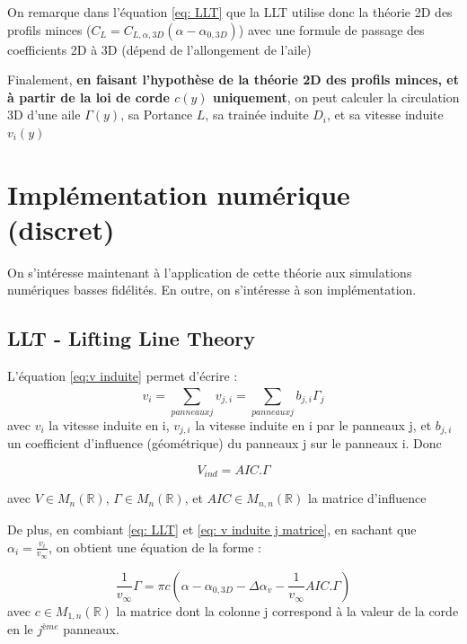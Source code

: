 On remarque dans l'équation \ref{eq: LLT} que la LLT utilise donc la théorie 2D des profils minces ($C_L = C_{L, \alpha, 3D}(\alpha - \alpha_{0,3D})$) avec une formule de passage des coefficients 2D à 3D (dépend de l'allongement de l'aile)

Finalement, \textbf{en faisant l'hypothèse de la théorie 2D des profils minces, et à partir de la loi de corde $c(y)$ uniquement}, on peut calculer la circulation 3D d'une aile $\Gamma(y)$, sa Portance $L$, sa trainée induite $D_i$, et sa vitesse induite $v_i(y)$

\section{Implémentation numérique (discret)} 
\label{sec:Ch1.2}

On s'intéresse maintenant à l'application de cette théorie aux simulations numériques basses fidélités. En outre, on s'intéresse à son implémentation. 

\subsection{LLT - Lifting Line Theory} 
\label{subsec:Ch1.2.1}

L'équation \ref{eq:v induite} permet d'écrire :
\begin{equation}
    v_i = \sum_{panneaux j}^{} v_{j,i} = \sum_{panneaux j}^{} b_{j,i} \Gamma_j
    \label{eq: v induite j}
\end{equation}
avec $v_i$ la vitesse induite en i, $v_{j,i}$ la vitesse induite en i par le panneaux j, et $b_{j,i}$ un coefficient d'influence (géométrique) du panneaux j sur le panneaux i. Donc 

\begin{equation}
    V_{ind} = AIC .\Gamma
    \label{eq: v induite j matrice}
\end{equation}

avec $V \in M_n(\mathbb{R})$, $\Gamma \in M_n(\mathbb{R})$, et $AIC \in M_{n,n}(\mathbb{R})$ la matrice d'influence

De plus, en combiant \ref{eq: LLT} et \ref{eq: v induite j matrice}, en sachant que $\alpha_i = \frac{v_i}{v_{\infty}}$, on obtient une équation de la forme : 

\begin{equation}
    \frac{1}{v_{\infty}}\Gamma = \pi c (\alpha-\alpha_{0,3D} - \Delta\alpha_v - \frac{1}{v_{\infty}} AIC.\Gamma)
    \label{eq: LLT gamma}
\end{equation}
avec $c \in M_{1,n}(\mathbb{R})$ la matrice dont la colonne j correspond à la valeur de la corde en le $j^{ème}$ panneaux.

